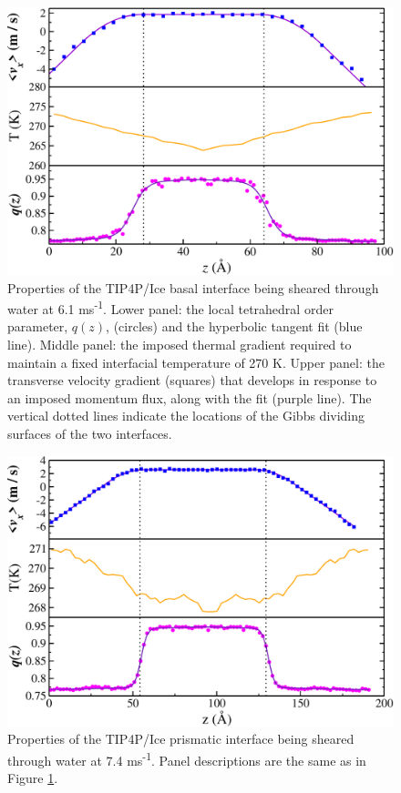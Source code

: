 \begin{figure}
\includegraphics[width=\linewidth]{Figures/Basal_TIP4PIce_Plot}
\caption{\label{fig:tipbComic} Properties of the TIP4P/Ice basal
  interface being sheared through water at 6.1
  ms\textsuperscript{-1}. Lower panel: the local tetrahedral order
  parameter, $q(z)$, (circles) and the hyperbolic tangent fit
  (blue line).  Middle panel: the imposed thermal gradient
  required to maintain a fixed interfacial temperature of 270 K. Upper
  panel: the transverse velocity gradient (squares) that develops in
  response to an imposed momentum flux, along with the fit (purple
  line). The vertical dotted lines indicate the locations of the Gibbs
  dividing surfaces of the two interfaces.}
\end{figure}

\begin{figure}
\includegraphics[width=\linewidth]{Figures/Prism_TIP4PIce_Plot}
\caption{\label{fig:tippComic} Properties of the TIP4P/Ice prismatic
  interface being sheared through water at 7.4 ms\textsuperscript{-1}.
  Panel descriptions are the same as in Figure \ref{fig:tipbComic}.}
\end{figure}


